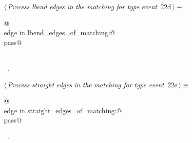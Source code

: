 \documentclass[10pt, english, oneside]{report}
\begin{document}
\begin{flushleft} \small
\begin{minipage}{\linewidth}\label{scrap27}\raggedright\small
{} $\langle\,${\itshape Process lbend edges in the matching for type  event}\nobreak\ {\footnotesize {22d}}$\,\rangle\equiv$
\vspace{-1ex}
\begin{list}{}{} \item
\mbox{}\verb@   @\\
\mbox{}\verb@for edge in lbend_edges_of_matching:@\\
\mbox{}\verb@        pass@\\
\mbox{}\verb@@\\
\mbox{}\verb@@{\NWsep}
\end{list}
\vspace{-1.5ex}
\footnotesize
\begin{list}{}{\setlength{\itemsep}{-\parsep}\setlength{\itemindent}{-\leftmargin}}
\item \NWtxtMacroRefIn\ .

\item{}
\end{list}
\end{minipage}\vspace{4ex}
\end{flushleft}


\begin{flushleft} \small
\begin{minipage}{\linewidth}\label{scrap28}\raggedright\small
{} $\langle\,${\itshape Process straight edges in the matching for type  event}\nobreak\ {\footnotesize {22e}}$\,\rangle\equiv$
\vspace{-1ex}
\begin{list}{}{} \item
\mbox{}\verb@   @\\
\mbox{}\verb@for edge in straight_edges_of_matching:@\\
\mbox{}\verb@      pass@\\
\mbox{}\verb@@{\NWsep}
\end{list}
\vspace{-1.5ex}
\footnotesize
\begin{list}{}{\setlength{\itemsep}{-\parsep}\setlength{\itemindent}{-\leftmargin}}
\item \NWtxtMacroRefIn\ .

\item{}
\end{list}
\end{minipage}\vspace{4ex}
\end{flushleft}
\end{document}
